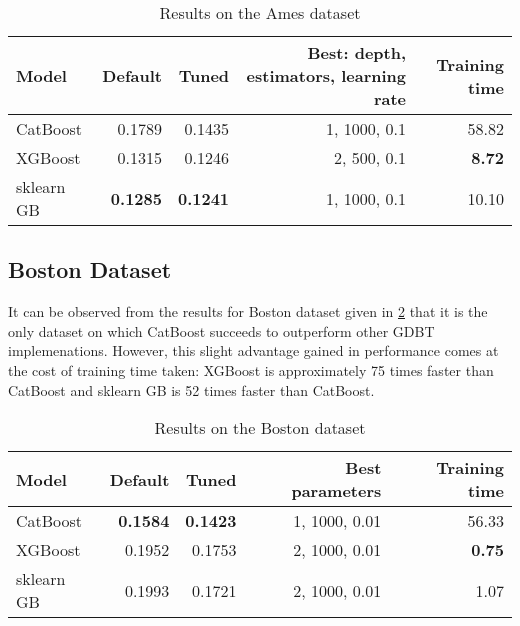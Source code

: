 \begin{table}[htbp]
	\centering
	\begin{tabular}{lrrrr}
		\toprule
		\textbf{Model} & \textbf{Default} & \textbf{Tuned} & \textbf{Best: depth, estimators, learning rate} & \textbf{Training time}  \\
		\midrule
		CatBoost & 0.1789 &  0.1435 & 1, 1000, 0.1  & 58.82\\
		XGBoost & 0.1315 & 0.1246 & 2, 500, 0.1 & \textbf{8.72} \\
		sklearn GB & \textbf{0.1285} & \textbf{0.1241} & 1, 1000, 0.1 & 10.10 \\
		\bottomrule
	\end{tabular}
	\caption{Results on the Ames dataset}
	\label{tab:ames-results}
\end{table}

\subsection{Boston Dataset}
It can be observed from the results for Boston dataset given in \cref{tab:boston-results} that it is the only dataset on which CatBoost succeeds to outperform other GDBT implemenations. However, this slight advantage gained in performance comes at the cost of training time taken: XGBoost is approximately 75 times faster than CatBoost and sklearn GB is 52 times faster than CatBoost. 

\begin{table}[htbp]
	\centering
	\begin{tabular}{lrrrr}
		\toprule
		\textbf{Model} & \textbf{Default} & \textbf{Tuned} & \textbf{Best parameters} & \textbf{Training time}  \\
		\midrule
		CatBoost & \textbf{0.1584} &  \textbf{0.1423} & 1, 1000, 0.01  & 56.33 \\
		XGBoost & 0.1952 & 0.1753  & 2, 1000, 0.01  & \textbf{0.75} \\
		sklearn GB & 0.1993 & 0.1721 & 2, 1000, 0.01  & 1.07 \\
		\bottomrule
	\end{tabular}
    \caption{Results on the Boston dataset}
	\label{tab:boston-results}
\end{table}



